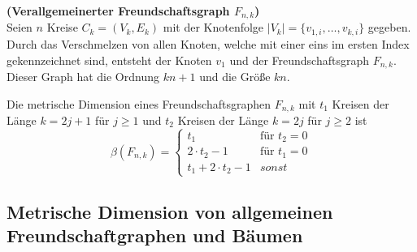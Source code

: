 \begin{defi}{\textbf{(Verallgemeinerter Freundschaftsgraph $F_{n,k}$)}}\\
Seien $n$ Kreise $C_k=(V_k,E_k)$ mit der Knotenfolge $|V_k|=\{v_{1,i},\ldots,v_{k,i}\}$ gegeben. Durch das Verschmelzen von allen Knoten, welche mit einer eins im ersten Index gekennzeichnet sind, entsteht der Knoten $v_1$ und der Freundschaftsgraph $F_{n,k}$. Dieser Graph hat die Ordnung $kn+1$ und die Größe $kn$.
\end{defi}

\begin{lem} \cite{amal}
\label{verallgFreundschaftsgraphen}
Die metrische Dimension eines Freundschaftsgraphen $F_{n,k}$ mit $t_1$ Kreisen der Länge $k=2j+1$ für $j \geq 1$ und $t_2$ Kreisen der Länge $k=2j$ für $j \geq 2$ ist 
\begin{equation}
   \beta(F_{n,k})=
   \begin{cases}
     t_1 & \text{f\"ur } t_2=0 \\
     2\cdot t_2-1 & \text{f\"ur } t_1=0 \\
     t_1+ 2\cdot t_2-1 & sonst
   \end{cases}
\end{equation}
\end{lem}

\subsection{Metrische Dimension von allgemeinen Freundschaftgraphen und Bäumen}
\label{amal}
\newpage
